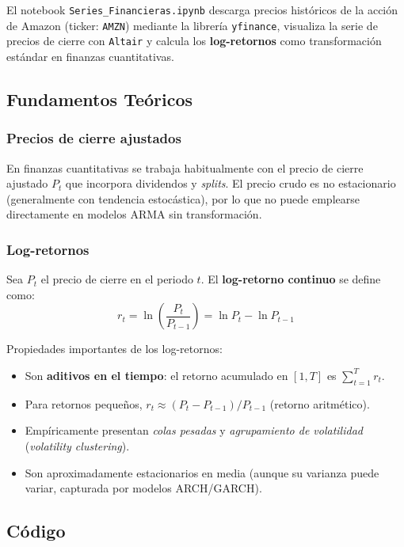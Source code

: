 \documentclass[12pt, a4paper]{article}
\begin{document}
El notebook \texttt{Series\_Financieras.ipynb} descarga precios históricos de
la acción de Amazon (ticker: \texttt{AMZN}) mediante la librería
\texttt{yfinance}, visualiza la serie de precios de cierre con \texttt{Altair}
y calcula los \textbf{log-retornos} como transformación estándar en finanzas
cuantitativas.

\subsection{Fundamentos Teóricos}

\subsubsection{Precios de cierre ajustados}

En finanzas cuantitativas se trabaja habitualmente con el precio de cierre
ajustado $P_t$ que incorpora dividendos y \textit{splits}. El precio crudo es
no estacionario (generalmente con tendencia estocástica), por lo que no puede
emplearse directamente en modelos ARMA sin transformación.

\subsubsection{Log-retornos}

Sea $P_t$ el precio de cierre en el periodo $t$. El \textbf{log-retorno
continuo} se define como:
\[
  r_t = \ln\!\left(\frac{P_t}{P_{t-1}}\right) = \ln P_t - \ln P_{t-1}
\]

Propiedades importantes de los log-retornos:
\begin{itemize}[noitemsep]
  \item Son \textbf{aditivos en el tiempo}: el retorno acumulado en $[1,T]$ es
        $\sum_{t=1}^{T} r_t$.
  \item Para retornos pequeños, $r_t \approx (P_t - P_{t-1})/P_{t-1}$ (retorno
        aritmético).
  \item Empíricamente presentan \textit{colas pesadas} y
        \textit{agrupamiento de volatilidad} (\textit{volatility clustering}).
  \item Son aproximadamente estacionarios en media (aunque su varianza puede
        variar, capturada por modelos ARCH/GARCH).
\end{itemize}

\subsection{Código}
\end{document}
